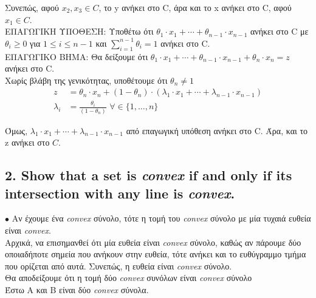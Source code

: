 \documentclass[12pt]{article}
\newcommand{\margin}{\hspace{4pt}}
\begin{document}
Συνεπώς, αφού $x_2, x_3 \in C$, το y ανήκει στο C, άρα και το x ανήκει στο C, αφού $x_1 \in C$. \\

ΕΠΑΓΩΓΙΚΗ ΥΠΟΘΕΣΗ: Υποθέτω ότι $θ_1 \cdot x_1 + \dotsb + θ_{n-1} \cdot x_{n-1}$ ανήκει στο C με $θ_i \geq 0$ για $1 \leq i \leq n-1$ και $ \sum_{i=1}^{n-1}θ_i = 1 $ ανήκει στο C. \\

ΕΠΑΓΩΓΙΚΟ ΒΗΜΑ: Θα δείξουμε ότι $θ_1 \cdot x_1 + \dotsb + θ_{n-1} \cdot x_{n-1} + θ_n \cdot x_n = z$ ανήκει στο C. \\

Χωρίς βλάβη της γενικότητας, υποθέτουμε ότι $θ_n \neq 1$\\

\begin{align*}
    z & = θ_n \cdot x_n + (1 - θ_n) \cdot (λ_1 \cdot x_1 + \dotsb + λ_{n-1} \cdot x_{n-1}) \\
    λ_i & = \frac{θ_i}{(1 - θ_n)} \margin \forall \in \lbrace 1, \dotsc, n \rbrace
\end{align*}

Όμως, $λ_1 \cdot x_1 + \dotsb + λ_{n-1} \cdot x_{n-1}$ από επαγωγική υπόθεση ανήκει στο C. Άρα, και το z ανήκει στο $C$.

\vspace{2in}

\pagebreak

\subsection*{2. Show that a set is \textit{convex} if and only if its intersection with any line is \textit{convex}.}

$\bullet$ Αν έχουμε ένα \textit{convex} σύνολο, τότε η τομή του \textit{convex} σύνολο με μία τυχαιά ευθεία είναι \textit{convex}. \\

Αρχικά, να επισημανθεί ότι μία ευθεία είναι \textit{convex} σύνολο,
καθώς αν πάρουμε δύο οποιαδήποτε σημεία που ανήκουν στην ευθεία,
τότε ανήκει και το ευθύγραμμο τμήμα που ορίζεται από αυτά.
Συνεπώς, η ευθεία είναι \textit{convex} σύνολο. \\

Θα αποδείξουμε ότι η τομή δύο \textit{convex} συνόλων είναι \textit{convex} σύνολο \\

Έστω Α και Β είναι δύο \textit{convex} σύνολα. \\
\end{document}
